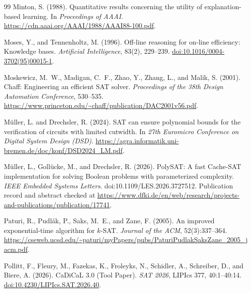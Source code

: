 \documentclass[11pt,a4paper]{article}
\numberwithin{equation}{section}
\theoremstyle{plain}
\theoremstyle{definition}
\theoremstyle{remark}
\begin{document}
\begin{thebibliography}{99}
Minton, S. (1988).
Quantitative results concerning the utility of explanation-based learning.
In \emph{Proceedings of AAAI}.
\url{https://cdn.aaai.org/AAAI/1988/AAAI88-100.pdf}.

Moses, Y., and Tennenholtz, M. (1996).
Off-line reasoning for on-line efficiency: Knowledge bases.
\emph{Artificial Intelligence}, 83(2), 229--239.
\href{https://doi.org/10.1016/0004-3702(95)00015-1}{doi:10.1016/0004-3702(95)00015-1}.

Moskewicz, M.~W., Madigan, C.~F., Zhao, Y., Zhang, L., and Malik, S. (2001).
Chaff: Engineering an efficient SAT solver.
\emph{Proceedings of the 38th Design Automation Conference}, 530--535.
\url{https://www.princeton.edu/~chaff/publication/DAC2001v56.pdf}.

M{\"u}ller, L. and Drechsler, R. (2024).
SAT can ensure polynomial bounds for the verification of circuits with limited cutwidth.
In \emph{27th Euromicro Conference on Digital System Design (DSD)}.
\url{https://agra.informatik.uni-bremen.de/doc/konf/DSD2024_LM.pdf}.

M{\"u}ller, L., Goll{\"u}cke, M., and Drechsler, R. (2026).
PolySAT: A fast Cache-SAT implementation for solving Boolean problems with parameterized complexity.
\emph{IEEE Embedded Systems Letters}.
doi:10.1109/LES.2026.3727512. Publication record and abstract checked at
\url{https://www.dfki.de/en/web/research/projects-and-publications/publication/17741}.

Paturi, R., Pudl{\'a}k, P., Saks, M.~E., and Zane, F. (2005).
An improved exponential-time algorithm for $k$-SAT.
\emph{Journal of the ACM}, 52(3):337--364.
\url{https://cseweb.ucsd.edu/~paturi/myPapers/pubs/PaturiPudlakSaksZane_2005_jacm.pdf}.

Pollitt, F., Fleury, M., Fazekas, K., Froleyks, N., Schidler, A., Schreiber, D., and Biere, A. (2026).
CaDiCaL 3.0 (Tool Paper).
\emph{SAT 2026}, LIPIcs 377, 40:1--40:14.
\href{https://doi.org/10.4230/LIPIcs.SAT.2026.40}{doi:10.4230/LIPIcs.SAT.2026.40}.


\end{thebibliography}
\end{document}
